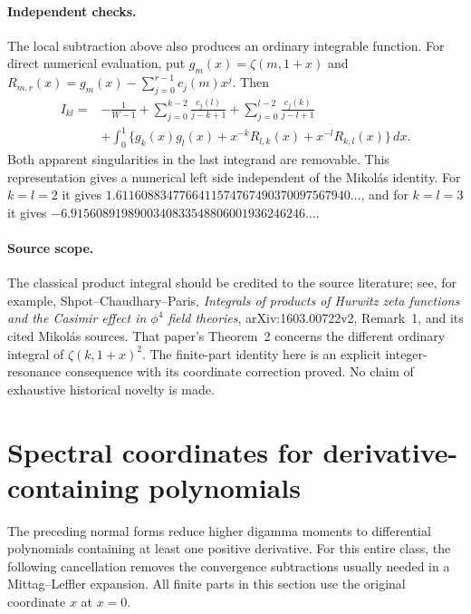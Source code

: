 \documentclass[11pt,a4paper]{article}
\numberwithin{equation}{section}
\theoremstyle{definition}
\theoremstyle{remark}
\begin{document}
\paragraph{Independent checks.}
The local subtraction above also produces an ordinary integrable
function.  For direct numerical evaluation, put
$g_m(x)=\zeta(m,1+x)$ and
$R_{m,r}(x)=g_m(x)-\sum_{j=0}^{r-1}c_j(m)x^j$.  Then
\begin{align*}
 I_{kl}={}&-\frac1{W-1}
 +\sum_{j=0}^{k-2}\frac{c_j(l)}{j-k+1}
 +\sum_{j=0}^{l-2}\frac{c_j(k)}{j-l+1}\\
 &+\int_0^1\{g_k(x)g_l(x)+x^{-k}R_{l,k}(x)
                                +x^{-l}R_{k,l}(x)\}\,dx.
\end{align*}
Both apparent singularities in the last integrand are removable.  This
representation gives a numerical left side independent of the
Mikol\'as identity.  For $k=l=2$ it gives
$1.6116088347766411574767490370097567940\ldots$, and for
$k=l=3$ it gives
$-6.9156089198900340833548806001936246246\ldots$.

\paragraph{Source scope.}
The classical product integral should be credited to the source
literature; see, for example, Shpot--Chaudhary--Paris,
\emph{Integrals of products of Hurwitz zeta functions and the Casimir
effect in $\phi^4$ field theories}, arXiv:1603.00722v2, Remark~1,
and its cited Mikol\'as sources.  That paper's Theorem~2 concerns the
different ordinary integral of $\zeta(k,1+x)^2$.  The finite-part
identity here is an explicit integer-resonance consequence with its
coordinate correction proved.  No claim of exhaustive historical
novelty is made.



\section{Spectral coordinates for derivative-containing polynomials}
\label{spectral:sec}

The preceding normal forms reduce higher digamma moments to differential
polynomials containing at least one positive derivative.  For this
entire class, the following cancellation removes the convergence
subtractions usually needed in a Mittag--Leffler expansion.  All finite
parts in this section use the original coordinate $x$ at $x=0$.
\end{document}
